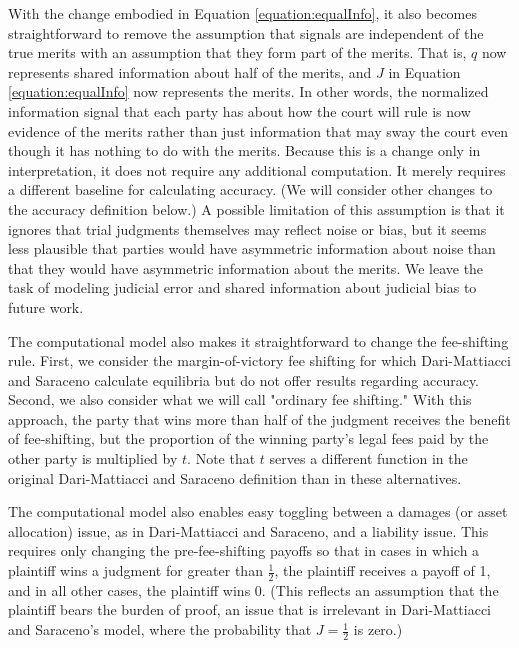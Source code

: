 \documentclass{article}
\begin{document}
With the change embodied in Equation \ref{equation:equalInfo}, it also becomes straightforward to remove the assumption that signals are independent of the true merits with an assumption that they form part of the merits. That is, $q$ now represents shared information about half of the merits, and $J$ in Equation \ref{equation:equalInfo} now represents the merits. In other words, the normalized information signal that each party has about how the court will rule is now evidence of the merits rather than just information that may sway the court even though it has nothing to do with the merits. Because this is a change only in interpretation, it does not require any additional computation. It merely requires a different baseline for calculating accuracy. (We will consider other changes to the accuracy definition below.) A possible limitation of this assumption is that it ignores that trial judgments themselves may reflect noise or bias, but it seems less plausible that parties would have asymmetric information about noise than that they would have asymmetric information about the merits. We leave the task of modeling judicial error and shared information about judicial bias to future work.

The computational model also makes it straightforward to change the fee-shifting rule. First, we consider the margin-of-victory fee shifting for which Dari-Mattiacci and Saraceno calculate equilibria but do not offer results regarding accuracy. Second, we also consider what we will call "ordinary fee shifting." With this approach, the party that wins more than half of the judgment receives the benefit of fee-shifting, but the proportion of the winning party's legal fees paid by the other party is multiplied by $t$. Note that $t$ serves a different function in the original Dari-Mattiacci and Saraceno definition than in these alternatives.

The computational model also enables easy toggling between a damages (or asset allocation) issue, as in Dari-Mattiacci and Saraceno, and a liability issue. This requires only changing the pre-fee-shifting payoffs so that in cases in which a plaintiff wins a judgment for greater than $\frac{1}{2}$, the plaintiff receives a payoff of 1, and in all other cases, the plaintiff wins 0. (This reflects an assumption that the plaintiff bears the burden of proof, an issue that is irrelevant in Dari-Mattiacci and Saraceno's model, where the probability that $J=\frac{1}{2}$ is zero.)
\end{document}
